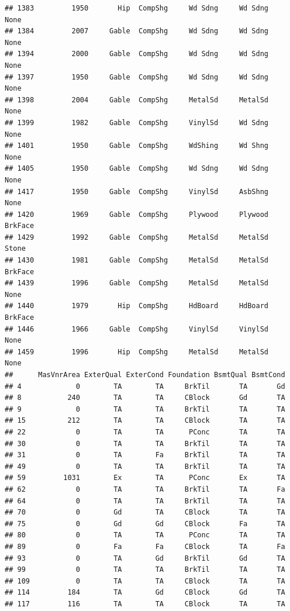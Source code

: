 \documentclass[]{article}
\begin{document}
\begin{verbatim}
## 1383         1950       Hip  CompShg     Wd Sdng     Wd Sdng       None
## 1384         2007     Gable  CompShg     Wd Sdng     Wd Sdng       None
## 1394         2000     Gable  CompShg     Wd Sdng     Wd Sdng       None
## 1397         1950     Gable  CompShg     Wd Sdng     Wd Sdng       None
## 1398         2004     Gable  CompShg     MetalSd     MetalSd       None
## 1399         1982     Gable  CompShg     VinylSd     Wd Sdng       None
## 1401         1950     Gable  CompShg     WdShing     Wd Shng       None
## 1405         1950     Gable  CompShg     Wd Sdng     Wd Sdng       None
## 1417         1950     Gable  CompShg     VinylSd     AsbShng       None
## 1420         1969     Gable  CompShg     Plywood     Plywood    BrkFace
## 1429         1992     Gable  CompShg     MetalSd     MetalSd      Stone
## 1430         1981     Gable  CompShg     MetalSd     MetalSd    BrkFace
## 1439         1996     Gable  CompShg     MetalSd     MetalSd       None
## 1440         1979       Hip  CompShg     HdBoard     HdBoard    BrkFace
## 1446         1966     Gable  CompShg     VinylSd     VinylSd       None
## 1459         1996       Hip  CompShg     MetalSd     MetalSd       None
##      MasVnrArea ExterQual ExterCond Foundation BsmtQual BsmtCond
## 4             0        TA        TA     BrkTil       TA       Gd
## 8           240        TA        TA     CBlock       Gd       TA
## 9             0        TA        TA     BrkTil       TA       TA
## 15          212        TA        TA     CBlock       TA       TA
## 22            0        TA        TA      PConc       TA       TA
## 30            0        TA        TA     BrkTil       TA       TA
## 31            0        TA        Fa     BrkTil       TA       TA
## 49            0        TA        TA     BrkTil       TA       TA
## 59         1031        Ex        TA      PConc       Ex       TA
## 62            0        TA        TA     BrkTil       TA       Fa
## 64            0        TA        TA     BrkTil       TA       TA
## 70            0        Gd        TA     CBlock       TA       TA
## 75            0        Gd        Gd     CBlock       Fa       TA
## 80            0        TA        TA      PConc       TA       TA
## 89            0        Fa        Fa     CBlock       TA       Fa
## 93            0        TA        Gd     BrkTil       Gd       TA
## 99            0        TA        TA     BrkTil       TA       TA
## 109           0        TA        TA     CBlock       TA       TA
## 114         184        TA        Gd     CBlock       Gd       TA
## 117         116        TA        TA     CBlock       TA       TA

\end{verbatim}
\end{document}
